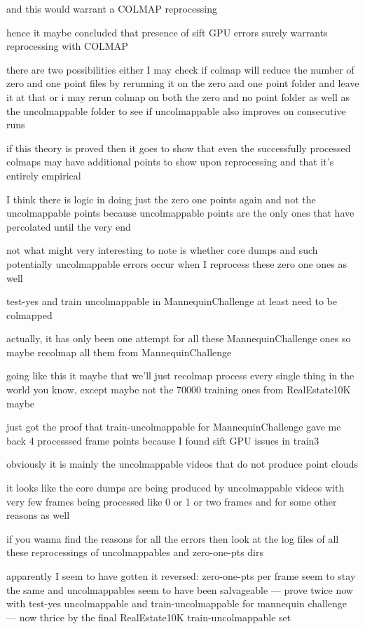 and this would warrant a COLMAP reprocessing

hence it maybe concluded that presence of sift GPU errors surely warrants reprocessing with COLMAP

there are two possibilities 
either I may check if colmap will reduce the number of zero and one point files by rerunning it on the zero and one point folder and leave it at that 
or i may rerun colmap on both the zero and no point folder as well as the uncolmappable folder to see if uncolmappable also improves on consecutive runs 

if this theory is proved then it goes to show that even the successfully processed colmaps may have additional points to show upon reprocessing and that it's entirely empirical

I think there is logic in doing just the zero one points again and not the uncolmappable points because uncolmappable points are the only ones that have percolated until the very end

not what might very interesting to note is whether core dumps and such potentially uncolmappable errors occur when I reprocess these zero one ones as well

test-yes and train uncolmappable in MannequinChallenge at least need to be colmapped

actually, it has only been one attempt for all these MannequinChallenge ones so maybe recolmap all them from MannequinChallenge

going like this it maybe that we'll just recolmap process every single thing in the world you know, except maybe not the 70000 training ones from RealEstate10K maybe

just got the proof that train-uncolmappable for MannequinChallenge gave me back 4 processsed frame points because I found sift GPU issues in train3

obviously it is mainly the uncolmappable videos that do not produce point clouds

it looks like the core dumps are being produced by uncolmappable videos with very few frames being processed
like 0 or 1 or two frames and for some other reasons as well

if you wanna find the reasons for all the errors then look at the log files of all these reprocessings of uncolmappables and zero-one-pts dirs 

apparently I seem to have gotten it reversed: zero-one-pts per frame seem to stay the same and uncolmappables seem to have been salvageable --- prove twice now with test-yes uncolmappable and train-uncolmappable for mannequin challenge --- now thrice by the final RealEstate10K train-uncolmappable set

